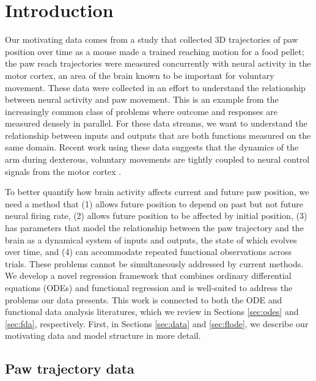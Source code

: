 \documentclass[preprint]{JASA}
\begin{document}



\hypertarget{introduction}{%
\section{Introduction}\label{introduction}}

\label{sec:intro}

Our motivating data comes from a study that collected 3D trajectories of
paw position over time as a mouse made a trained reaching motion for a
food pellet; the paw reach trajectories were measured concurrently with
neural activity in the motor cortex, an area of the brain known to be
important for voluntary movement. These data were collected in an effort
to understand the relationship between neural activity and paw movement.
This is an example from the increasingly common class of problems where
outcome and responses are measured densely in parallel. For these data
streams, we want to understand the relationship between inputs and
outputs that are both functions measured on the same domain. Recent work
using these data suggests that the dynamics of the arm during dexterous,
voluntary movements are tightly coupled to neural control signals from
the motor cortex \citep{guo2015, sauerbrei2018}.

To better quantify how brain activity affects current and future paw
position, we need a method that (1) allows future position to depend on
past but not future neural firing rate, (2) allows future position to be
affected by initial position, (3) has parameters that model the
relationship between the paw trajectory and the brain as a dynamical
system of inputs and outputs, the state of which evolves over time, and
(4) can accommodate repeated functional observations across trials.
These problems cannot be simultaneously addressed by current methods. We
develop a novel regression framework that combines ordinary differential
equations (ODEs) and functional regression and is well-suited to address
the problems our data presents. This work is connected to both the ODE
and functional data analysis literatures, which we review in Sections
\ref{sec:odes} and \ref{sec:fda}, respectively. First, in Sections
\ref{sec:data} and \ref{sec:flode}, we describe our motivating data and
model structure in more detail.

\hypertarget{paw-trajectory-data}{%
\subsection{Paw trajectory data}\label{paw-trajectory-data}}
\end{document}
